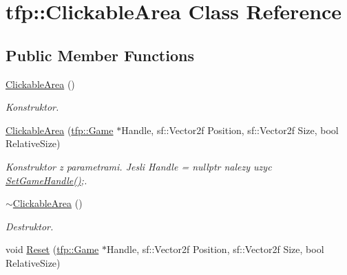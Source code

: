 \hypertarget{classtfp_1_1_clickable_area}{}\section{tfp\+:\+:Clickable\+Area Class Reference}
\label{classtfp_1_1_clickable_area}
\subsection*{Public Member Functions}
\begin{DoxyCompactItemize}
\item 
\mbox{\label{classtfp_1_1_clickable_area_a430e91404b609c35d883c2259ea34fdf}} 
\mbox{\hyperlink{classtfp_1_1_clickable_area_a430e91404b609c35d883c2259ea34fdf}{Clickable\+Area}} ()
\begin{DoxyCompactList}\small\item\em Konstruktor. \end{DoxyCompactList}\item 
\mbox{\label{classtfp_1_1_clickable_area_a7352d983d6b4847ba14dbf934154c578}} 
\mbox{\hyperlink{classtfp_1_1_clickable_area_a7352d983d6b4847ba14dbf934154c578}{Clickable\+Area}} (\mbox{\hyperlink{classtfp_1_1_game}{tfp\+::\+Game}} $\ast$Handle, sf\+::\+Vector2f Position, sf\+::\+Vector2f Size, bool Relative\+Size)
\begin{DoxyCompactList}\small\item\em Konstruktor z parametrami. Jesli Handle = nullptr nalezy uzyc \mbox{\hyperlink{classtfp_1_1_clickable_area_ad2384603fab60ebb57c9f07d81885294}{Set\+Game\+Handle()}};. \end{DoxyCompactList}\item 
\mbox{\label{classtfp_1_1_clickable_area_acfc318db2a45a07e8e8c31418aeceeca}} 
\mbox{\hyperlink{classtfp_1_1_clickable_area_acfc318db2a45a07e8e8c31418aeceeca}{$\sim$\+Clickable\+Area}} ()
\begin{DoxyCompactList}\small\item\em Destruktor. \end{DoxyCompactList}\item 
\mbox{\label{classtfp_1_1_clickable_area_ab642055e04ace78218510c42a97f0f01}} 
void \mbox{\hyperlink{classtfp_1_1_clickable_area_ab642055e04ace78218510c42a97f0f01}{Reset}} (\mbox{\hyperlink{classtfp_1_1_game}{tfp\+::\+Game}} $\ast$Handle, sf\+::\+Vector2f Position, sf\+::\+Vector2f Size, bool Relative\+Size)

\end{DoxyCompactItemize}
